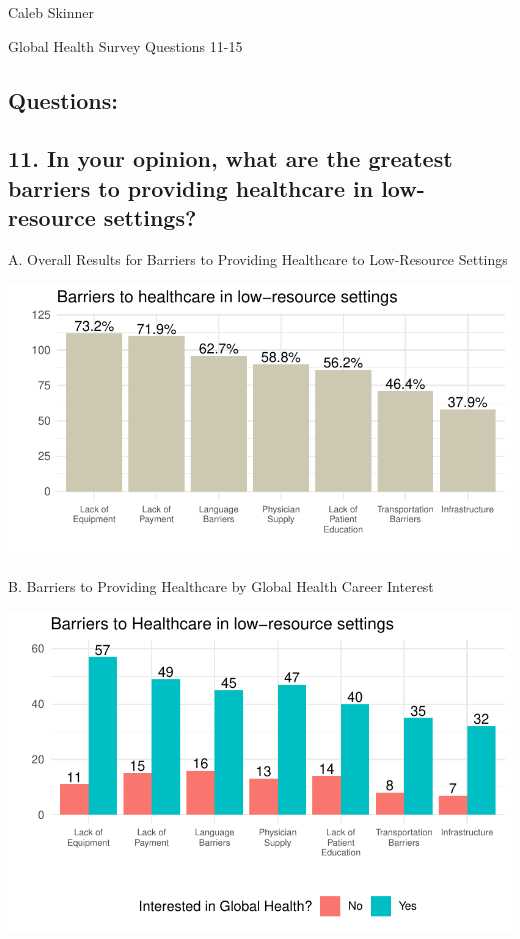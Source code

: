\documentclass[
  letterpaper,
  DIV=11,
  numbers=noendperiod]{scrartcl}
\author{}
\date{}
\begin{document}
\ifdefined\Shaded\renewenvironment{Shaded}{\begin{tcolorbox}[boxrule=0pt, breakable, enhanced, sharp corners, interior hidden, frame hidden, borderline west={3pt}{0pt}{shadecolor}]}{\end{tcolorbox}}\fi

Caleb Skinner

Global Health Survey Questions 11-15

\hypertarget{questions}{%
\subsection{Questions:}\label{questions}}

\hypertarget{in-your-opinion-what-are-the-greatest-barriers-to-providing-healthcare-in-low-resource-settings}{%
\subsection{11. In your opinion, what are the greatest barriers to
providing healthcare in low-resource
settings?}\label{in-your-opinion-what-are-the-greatest-barriers-to-providing-healthcare-in-low-resource-settings}}

A. Overall Results for Barriers to Providing Healthcare to Low-Resource
Settings

\includegraphics{GlobalHealthQuarto11-15_files/figure-pdf/unnamed-chunk-2-1.pdf}

\newpage

B. Barriers to Providing Healthcare by Global Health Career Interest

\includegraphics{GlobalHealthQuarto11-15_files/figure-pdf/unnamed-chunk-3-1.pdf}
\end{document}
